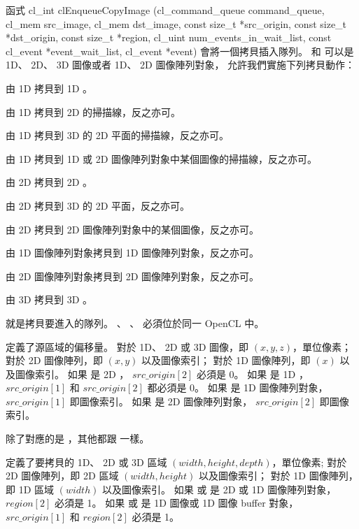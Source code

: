 函式
\startCLFUNC
cl_int clEnqueueCopyImage (cl_command_queue command_queue,
			cl_mem src_image,
			cl_mem dst_image,
			const size_t *src_origin,
			const size_t *dst_origin,
			const size_t *region,
			cl_uint num_events_in_wait_list,
			const cl_event *event_wait_list,
			cl_event *event)
\stopCLFUNC
會將一個拷貝插入隊列。
  和  可以是 1D、 2D、 3D 圖像或者 1D、 2D 圖像陣列對象，
允許我們實施下列拷貝動作：
\startigBase
\item 由 1D 拷貝到 1D 。
\item 由 1D 拷貝到 2D  的掃描線，反之亦可。
\item 由 1D 拷貝到 3D  的 2D 平面的掃描線，反之亦可。
\item 由 1D 拷貝到 1D 或 2D 圖像陣列對象中某個圖像的掃描線，反之亦可。
\item 由 2D 拷貝到 2D 。
\item 由 2D 拷貝到 3D  的 2D 平面，反之亦可。
\item 由 2D 拷貝到 2D 圖像陣列對象中的某個圖像，反之亦可。
\item 由 1D 圖像陣列對象拷貝到 1D 圖像陣列對象，反之亦可。
\item 由 2D 圖像陣列對象拷貝到 2D 圖像陣列對象，反之亦可。
\item 由 3D 拷貝到 3D 。
\stopigBase

 就是拷貝要進入的隊列。
、 、  必須位於同一 OpenCL 中。

 定義了源區域的偏移量。
對於 1D、 2D 或 3D 圖像，即 $(x, y, z)$，單位像素；
對於 2D 圖像陣列，即 $(x, y)$ 以及圖像索引；
對於 1D 圖像陣列，即 $(x)$ 以及圖像索引。
如果  是 2D ， $src\_origin[2]$ 必須是 0。
如果  是 1D ，$src\_origin[1]$ 和 $src\_origin[2]$ 都必須是 0。
如果  是 1D 圖像陣列對象， $src\_origin[1]$ 即圖像索引。
如果  是 2D 圖像陣列對象， $src\_origin[2]$ 即圖像索引。

 除了對應的是 ，其他都跟  一樣。

 定義了要拷貝的 1D、 2D 或 3D 區域 $(width, height, depth)$，單位像素;
對於 2D 圖像陣列，即 2D 區域 $(width, height)$ 以及圖像索引；
對於 1D 圖像陣列，即 1D 區域 $(width)$ 以及圖像索引。
如果  或  是 2D  或 1D 圖像陣列對象， $region[2]$ 必須是 1。
如果  或  是 1D 圖像或 1D 圖像 buffer 對象， $src\_origin[1]$ 和 $region[2]$ 必須是 1。

